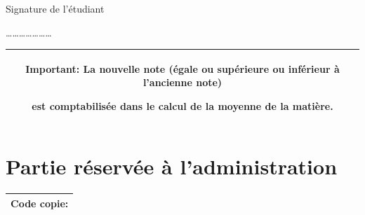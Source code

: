 \documentclass{article}
\begin{document}
\vspace{2mm}
\begin{flushright}
 Signature de l'étudiant
 
 \vspace{8mm}
 \dots\dots\dots\dots\dots\dots\dots
\end{flushright}
\vspace{-17mm}
\hspace{4.7mm}
\begin{tabular}{|c|}
\hline
 \begin{minipage}{121mm}
 \vspace{3mm}
 \hspace{3mm}
 \textbf{Important:} La nouvelle note (égale ou supérieure ou inférieur à l'ancienne note)
 
 \hspace{3mm} est comptabilisée dans le calcul de la moyenne de la matière.
 \vspace{3mm}
 \end{minipage}\\
 
 \hline
\end{tabular}


\vspace{12mm}
\section{Partie réservée à l'administration}

\hspace{4.5mm}
\begin{tabular}{|c|}
\hline
 \begin{minipage}{51mm}
 \vspace{3mm}
 \hspace{3mm}
 Code copie:
 \vspace{3mm}
 \end{minipage}\\
 
 \hline
\end{tabular}
\vspace{7mm}
\end{document}
